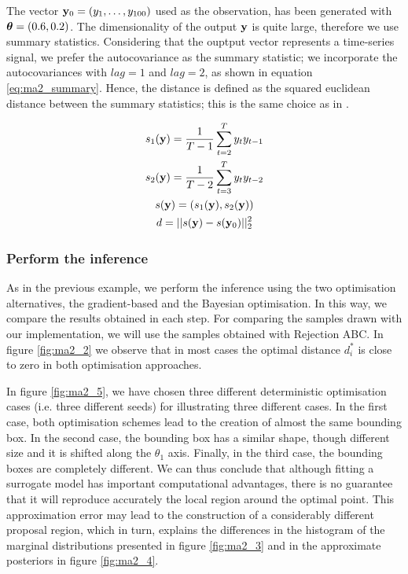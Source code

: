 \noindent
The vector $\mathbf{y}_0 = (y_1, \ldots, y_{100})$ used as the observation,
has been generated with $\boldsymbol{\theta}=(0.6, 0.2)$. The dimensionality of
the output $\mathbf{y}$ is quite large, therefore we use summary
statistics. Considering that the ouptput vector represents a
time-series signal, we prefer the autocovariance as the summary
statistic; we incorporate the autocovariances with $lag=1$ and
$lag=2$, as shown in equation \eqref{eq:ma2_summary}. Hence, the
distance is defined as the squared euclidean distance between the
summary statistics; this is the same choice as in \autocite{Marin2012}.

\begin{gather} \label{eq:ma2_summary}
  s_1(\mathbf{y}) = \frac{1}{T-1} \sum_{t=2}^T y_ty_{t-1}\\
  s_2(\mathbf{y}) = \frac{1}{T-2} \sum_{t=3}^T y_ty_{t-2} \\
  s(\mathbf{y}) = (s_1(\mathbf{y}), s_2(\mathbf{y}))\\
  d = ||s(\mathbf{y}) - s(\mathbf{y}_0)||_2^2
\end{gather}


\subsubsection*{Perform the inference}

As in the previous example, we perform the inference using the two
optimisation alternatives, the gradient-based and the Bayesian
optimisation. In this way, we compare the results obtained in each
step. For comparing the samples drawn with our implementation, we will
use the samples obtained with Rejection ABC. In figure \ref{fig:ma2_2}
we observe that in most cases the optimal distance $d_i^*$ is close to
zero in both optimisation approaches.

In figure \ref{fig:ma2_5}, we have chosen three different
deterministic optimisation cases (i.e. three different seeds) for
illustrating three different cases. In the first case, both
optimisation schemes lead to the creation of almost the same bounding
box. In the second case, the bounding box has a similar shape, though
different size and it is shifted along the $\theta_1$ axis. Finally,
in the third case, the bounding boxes are completely different. We can
thus conclude that although fitting a surrogate model has important
computational advantages, there is no guarantee that it will reproduce
accurately the local region around the optimal point. This
approximation error may lead to the construction of a considerably
different proposal region, which in turn, explains the differences in
the histogram of the marginal distributions presented in figure
\ref{fig:ma2_3} and in the approximate posteriors in figure
\ref{fig:ma2_4}.

